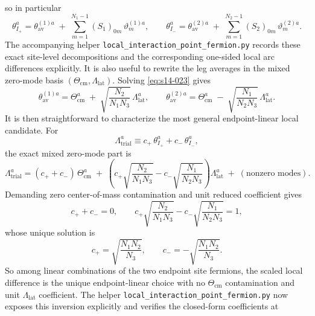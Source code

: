 \documentclass[11pt]{article}
\numberwithin{equation}{section}
\begin{document}
so in particular
\begin{equation}
\label{eq:s14-023b}
\theta_{I_+}^a
=
\theta_{\mathrm{av}}^{(1)a}
\;+\;
\sum_{m=1}^{N_1-1}(S_1)_{0m}\,\vartheta_m^{(1)a},
\qquad
\theta_{I_-}^a
=
\theta_{\mathrm{av}}^{(2)a}
\;+\;
\sum_{m=1}^{N_2-1}(S_2)_{0m}\,\vartheta_m^{(2)a}.
\end{equation}
The accompanying helper \texttt{local\_interaction\_point\_fermion.py} records these exact site-level decompositions and the corresponding one-sided local arc differences explicitly.
It is also useful to rewrite the leg averages in the mixed zero-mode basis $(\Theta_{\mathrm{cm}},\Lambda_{\mathrm{lat}})$. Solving \eqref{eq:s14-023} gives
\begin{equation}
\label{eq:s14-023c}
\theta_{\mathrm{av}}^{(1)a}
=
\Theta_{\mathrm{cm}}^a
\;+\;
\sqrt{\frac{N_2}{N_1N_3}}\,\Lambda_{\mathrm{lat}}^a,
\qquad
\theta_{\mathrm{av}}^{(2)a}
=
\Theta_{\mathrm{cm}}^a
\;-\;
\sqrt{\frac{N_1}{N_2N_3}}\,\Lambda_{\mathrm{lat}}^a.
\end{equation}
It is then straightforward to characterize the most general endpoint-linear local
candidate. For
\begin{equation}
\label{eq:s14-023c1}
\Lambda_{\mathrm{trial}}^a
\equiv
c_+\,\theta_{I_+}^a+c_-\,\theta_{I_-}^a,
\end{equation}
the exact mixed zero-mode part is
\begin{equation}
\label{eq:s14-023c2}
\Lambda_{\mathrm{trial}}^a
=
(c_+ + c_-)\,\Theta_{\mathrm{cm}}^a
\;+\;
\left(
c_+\sqrt{\frac{N_2}{N_1N_3}}
-c_-\sqrt{\frac{N_1}{N_2N_3}}
\right)\Lambda_{\mathrm{lat}}^a
\;+\;(\text{nonzero modes}).
\end{equation}
Demanding zero center-of-mass contamination and unit reduced coefficient gives
\begin{equation}
\label{eq:s14-023c3}
c_+ + c_- = 0,
\qquad
c_+\sqrt{\frac{N_2}{N_1N_3}}
-c_-\sqrt{\frac{N_1}{N_2N_3}}
=1,
\end{equation}
whose unique solution is
\begin{equation}
\label{eq:s14-023c4}
c_+=\sqrt{\frac{N_1N_2}{N_3}},
\qquad
c_-=-\sqrt{\frac{N_1N_2}{N_3}}.
\end{equation}
So among linear combinations of the two endpoint site fermions, the scaled
local difference is the unique endpoint-linear choice with no
$\Theta_{\mathrm{cm}}$ contamination and unit $\Lambda_{\mathrm{lat}}$
coefficient. The helper \texttt{local\_interaction\_point\_fermion.py} now
exposes this inversion explicitly and verifies the closed-form coefficients at
\end{document}
